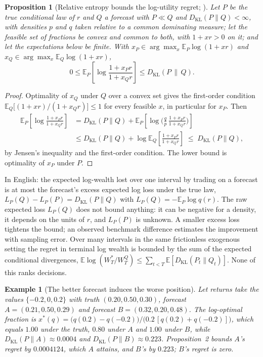 \documentclass[11pt]{article}
\newtheorem{proposition}{Proposition}
\newtheorem{example}{Example}
\newcommand{\E}{\mathbb{E}}
\newcommand{\KL}{D_{\mathrm{KL}}}
\begin{document}
\begin{proposition}[Relative entropy bounds the log-utility regret; \citealt{barron1988}]
Let $P$ be the true conditional law of $r$ and $Q$ a forecast with $P \ll Q$ and $\KL(P\|Q) < \infty$, with densities $p$ and $q$ taken relative to a common dominating measure; let the feasible set of fractions be convex and common to both, with $1 + xr > 0$ on it; and let the expectations below be finite. With $x_P \in \arg\max_x \E_P \log(1 + xr)$ and $x_Q \in \arg\max_x \E_Q \log(1 + xr)$,
\[
0 \le \E_P\!\left[\log \frac{1 + x_P r}{1 + x_Q r}\right] \le \KL(P \,\|\, Q).
\]
\end{proposition}
\begin{proof}
Optimality of $x_Q$ under $Q$ over a convex set gives the first-order condition $\E_Q\big[(1 + x r)/(1 + x_Q r)\big] \le 1$ for every feasible $x$, in particular for $x_P$. Then
\begin{align*}
\E_P\!\left[\log \frac{1 + x_P r}{1 + x_Q r}\right]
&= \KL(P\|Q) + \E_P\!\left[\log\Big(\frac{q}{p}\,\frac{1 + x_P r}{1 + x_Q r}\Big)\right] \\
&\le \KL(P\|Q) + \log \E_Q\!\left[\frac{1 + x_P r}{1 + x_Q r}\right] \;\le\; \KL(P\|Q),
\end{align*}
by Jensen's inequality and the first-order condition. The lower bound is optimality of $x_P$ under $P$.
\end{proof}

In English: the expected log-wealth lost over one interval by trading on a forecast is at most the forecast's excess expected log loss under the true law, $L_P(Q) - L_P(P) = \KL(P\|Q)$ with $L_P(Q) = -\E_P \log q(r)$. The raw expected loss $L_P(Q)$ does not bound anything: it can be negative for a density, it depends on the units of $r$, and $L_P(P)$ is unknown. A smaller excess loss tightens the bound; an observed benchmark difference estimates the improvement with sampling error. Over many intervals in the same frictionless exogenous setting the regret in terminal log wealth is bounded by the sum of the expected conditional divergences, $\E \log(W_T^\ast / W_T^Q) \le \sum_{t < T} \E[\KL(P_t \| Q_t)]$. None of this ranks decisions.

\begin{example}[The better forecast induces the worse position]
Let returns take the values $\{-0.2, 0, 0.2\}$ with truth $(0.20, 0.50, 0.30)$, forecast $A = (0.21, 0.50, 0.29)$ and forecast $B = (0.32, 0.20, 0.48)$. The log-optimal fraction is $x^\ast(q) = \big(q(0.2) - q(-0.2)\big)/\big(0.2\,[q(0.2) + q(-0.2)]\big)$, which equals $1.00$ under the truth, $0.80$ under $A$ and $1.00$ under $B$, while $\KL(P\|A) \approx 0.0004$ and $\KL(P\|B) \approx 0.223$. Proposition~2 bounds $A$'s regret by $0.0004124$, which $A$ attains, and $B$'s by $0.223$; $B$'s regret is zero.
\end{example}
\end{document}
